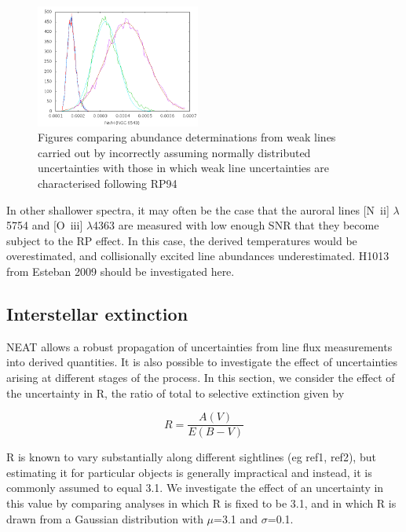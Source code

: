 \documentclass[useAMS,usenatbib]{mn2e}
\begin{document}
\begin{figure}
\includegraphics[width=0.48\textwidth]{figures/ngc6543_ne_rpeffect.png}
\caption{Figures comparing abundance determinations from weak lines carried out by incorrectly assuming normally distributed uncertainties with those in which weak line uncertainties are characterised following RP94}
\label{RP_figures}
\end{figure}


In other shallower spectra, it may often be the case that the auroral lines [N~{\sc ii}] $\lambda$5754 and [O~{\sc iii}] $\lambda$4363 are measured with low enough SNR that they become subject to the RP effect.  In this case, the derived temperatures would be overestimated, and collisionally excited line abundances underestimated.  H1013 from Esteban 2009 should be investigated here.

\subsection{Interstellar extinction}
\label{extinction}

NEAT allows a robust propagation of uncertainties from line flux measurements into derived quantities.  It is also possible to investigate the effect of uncertainties arising at different stages of the process.  In this section, we consider the effect of the uncertainty in R, the ratio of total to selective extinction given by

\begin{equation}
R = \frac{A(V)}{E(B-V)}
\end{equation}

R is known to vary substantially along different sightlines (eg ref1, ref2), but estimating it for particular objects is generally impractical and instead, it is commonly assumed to equal 3.1.  We investigate the effect of an uncertainty in this value by comparing analyses in which R is fixed to be 3.1, and in which R is drawn from a Gaussian distribution with $\mu$=3.1 and $\sigma$=0.1.
\end{document}
